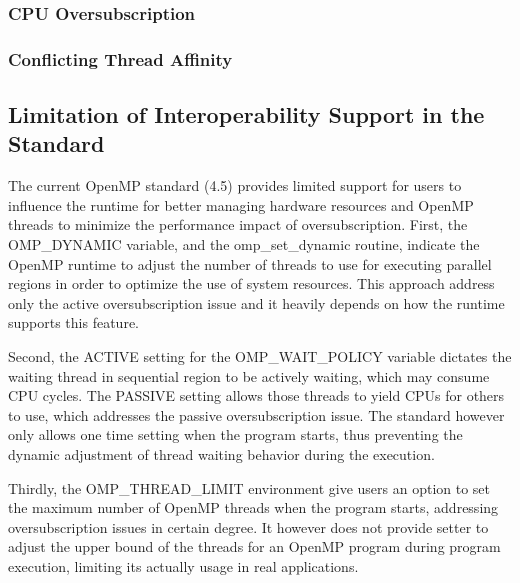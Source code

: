\subsubsection{CPU Oversubscription}


\subsubsection{Conflicting Thread Affinity}


\subsection{Limitation of Interoperability Support in the Standard}
The current OpenMP standard (4.5) provides limited support for users to influence the runtime for 
better managing hardware resources and OpenMP threads to minimize the performance impact of oversubscription.
First, the {\sf OMP\_DYNAMIC} variable, %
and the {\sf omp\_set\_dynamic} %
 routine, indicate the OpenMP runtime to adjust the number of threads to use for executing parallel
regions in order to optimize the use of system resources. 
This approach address only the active oversubscription issue and it heavily depends on how the runtime supports this feature. 

Second, the {\sf ACTIVE} setting for the {\sf OMP\_WAIT\_POLICY} variable %
dictates the waiting thread in sequential region to be actively waiting, which may consume CPU cycles.
The {\sf PASSIVE} setting allows those threads to yield CPUs for others to use, which addresses the passive 
oversubscription issue. The standard however only allows one time setting when the program starts, thus 
preventing the dynamic adjustment of thread waiting behavior during the execution. 

Thirdly, the {\sf OMP\_THREAD\_LIMIT} environment %
give users an option to  
 set the maximum number of OpenMP threads when the program starts, addressing oversubscription issues in certain
 degree. It however does not provide setter to adjust the upper bound of the threads for an OpenMP program during program execution, limiting
 its actually usage in real applications. 

